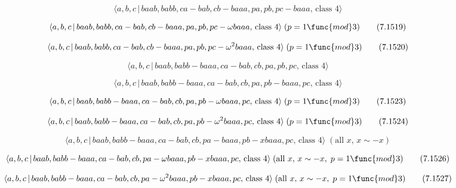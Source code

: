 \documentclass[10pt]{article}
\begin{document}
\begin{equation}
\langle a,b,c\,|\,baab,babb,ca-bab,cb-baaa,pa,pb,pc-baaa,\,\text{class }%
4\rangle  \tag{7.1518}
\end{equation}

\begin{equation}
\langle a,b,c\,|\,baab,babb,ca-bab,cb-baaa,pa,pb,pc-\omega baaa,\,\text{%
class }4\rangle \;(p=1\func{mod}3)  \tag{7.1519}
\end{equation}

\begin{equation}
\langle a,b,c\,|\,baab,babb,ca-bab,cb-baaa,pa,pb,pc-\omega ^{2}baaa,\,\text{%
class }4\rangle \;(p=1\func{mod}3)  \tag{7.1520}
\end{equation}

\begin{equation}
\langle a,b,c\,|\,baab,babb-baaa,ca-bab,cb,pa,pb,pc,\,\text{class }4\rangle 
\tag{7.1521}
\end{equation}

\begin{equation}
\langle a,b,c\,|\,baab,babb-baaa,ca-bab,cb,pa,pb-baaa,pc,\,\text{class }%
4\rangle  \tag{7.1522}
\end{equation}

\begin{equation}
\langle a,b,c\,|\,baab,babb-baaa,ca-bab,cb,pa,pb-\omega baaa,pc,\,\text{%
class }4\rangle \;(p=1\func{mod}3)  \tag{7.1523}
\end{equation}

\begin{equation}
\langle a,b,c\,|\,baab,babb-baaa,ca-bab,cb,pa,pb-\omega ^{2}baaa,pc,\,\text{%
class }4\rangle \;(p=1\func{mod}3)  \tag{7.1524}
\end{equation}

\begin{equation}
\langle a,b,c\,|\,baab,babb-baaa,ca-bab,cb,pa-baaa,pb-xbaaa,pc,\,\text{class 
}4\rangle \;(\text{all }x,\,x\sim -x)  \tag{7.1525}
\end{equation}

\begin{equation}
\langle a,b,c\,|\,baab,babb-baaa,ca-bab,cb,pa-\omega baaa,pb-xbaaa,pc,\,%
\text{class }4\rangle \;(\text{all }x,\,x\sim -x,\;p=1\func{mod}3) 
\tag{7.1526}
\end{equation}

\begin{equation}
\langle a,b,c\,|\,baab,babb-baaa,ca-bab,cb,pa-\omega ^{2}baaa,pb-xbaaa,pc,\,%
\text{class }4\rangle \;(\text{all }x,\,x\sim -x,\;p=1\func{mod}3) 
\tag{7.1527}
\end{equation}
\end{document}

